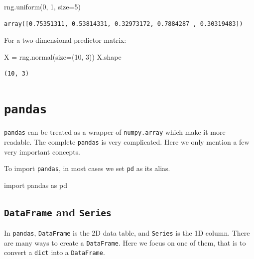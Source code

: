 \documentclass[
  letterpaper,
  DIV=11,
  numbers=noendperiod]{scrreprt}
\newenvironment{Shaded}{\begin{snugshade}}{\end{snugshade}}
\newcommand{\DecValTok}[1]{\textcolor[rgb]{0.68,0.00,0.00}{#1}}
\newcommand{\ImportTok}[1]{\textcolor[rgb]{0.00,0.46,0.62}{#1}}
\newcommand{\NormalTok}[1]{\textcolor[rgb]{0.00,0.23,0.31}{#1}}
\newcommand{\OperatorTok}[1]{\textcolor[rgb]{0.37,0.37,0.37}{#1}}
\theoremstyle{definition}
\theoremstyle{definition}
\theoremstyle{plain}
\theoremstyle{plain}
\theoremstyle{remark}
\begin{document}
\begin{Shaded}
\begin{Highlighting}[]
\NormalTok{rng.uniform(}\DecValTok{0}\NormalTok{, }\DecValTok{1}\NormalTok{, size}\OperatorTok{=}\DecValTok{5}\NormalTok{)}
\end{Highlighting}
\end{Shaded}

\begin{verbatim}
array([0.75351311, 0.53814331, 0.32973172, 0.7884287 , 0.30319483])
\end{verbatim}

For a two-dimensional predictor matrix:

\begin{Shaded}
\begin{Highlighting}[]
\NormalTok{X }\OperatorTok{=}\NormalTok{ rng.normal(size}\OperatorTok{=}\NormalTok{(}\DecValTok{10}\NormalTok{, }\DecValTok{3}\NormalTok{))}
\NormalTok{X.shape}
\end{Highlighting}
\end{Shaded}

\begin{verbatim}
(10, 3)
\end{verbatim}

\section{\texorpdfstring{\texttt{pandas}}{pandas}}\label{pandas}

\texttt{pandas} can be treated as a wrapper of \texttt{numpy.array}
which make it more readable. The complete \texttt{pandas} is very
complicated. Here we only mention a few very important concepts.

To import \texttt{pandas}, in most cases we set \texttt{pd} as its
alias.

\begin{Shaded}
\begin{Highlighting}[]
\ImportTok{import}\NormalTok{ pandas }\ImportTok{as}\NormalTok{ pd}
\end{Highlighting}
\end{Shaded}

\subsection{\texorpdfstring{\texttt{DataFrame} and
\texttt{Series}}{DataFrame and Series}}\label{dataframe-and-series}

In \texttt{pandas}, \texttt{DataFrame} is the 2D data table, and
\texttt{Series} is the 1D column. There are many ways to create a
\texttt{DataFrame}. Here we focus on one of them, that is to convert a
\texttt{dict} into a \texttt{DataFrame}.
\end{document}
